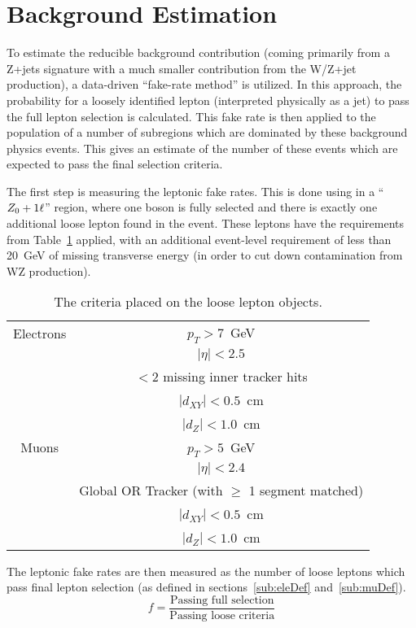 \section{Background Estimation}
\label{sec:bgEst}
To estimate the reducible background contribution (coming primarily from a
Z+jets signature with a much smaller contribution from the W/Z+jet production),
a data-driven ``fake-rate method'' is utilized. In this approach, the
probability for a loosely identified lepton (interpreted physically as a jet) to
pass the full lepton selection is calculated. This fake rate is then applied to
the population of a number of subregions which are dominated by these background
physics events. This gives an estimate of the number of these events which are
expected to pass the final selection criteria.

The first step is measuring the leptonic fake rates. This is done using in a
``${Z}_0 + 1 \ell$'' region, where one \Z boson is fully selected and there is exactly
one additional loose lepton found in the event. These leptons have the
requirements from Table~\ref{tab:looseLeps} applied, with an additional
event-level requirement of less than 20~GeV of missing transverse energy (in
order to cut down contamination from WZ production).

\begin{table}[h]
\centering
\begin{tabular}{|c|c|}
\hline
Electrons & $p_{T}>7$~GeV\\
& $|\eta|<2.5$\\
& $<2$ missing inner tracker hits\\
& $|d_{XY}| < 0.5 $~cm  \\
& $|d_{Z}| < 1.0 $~cm \\
\hline
\hline
Muons & $p_{T}>5$~GeV\\
& $|\eta|<2.4$\\
& Global OR Tracker (with $\ge$ 1 segment matched)\\
& $|d_{XY}| < 0.5$~cm  \\
& $|d_{Z}| < 1.0$~cm  \\
\hline
\end{tabular}
\caption[Loose lepton definitions.]{The criteria placed on the loose lepton objects.}
\label{tab:looseLeps}
\end{table}
The leptonic fake rates are then measured as the number of loose leptons which
pass final lepton selection (as defined in sections~\ref{sub:eleDef}
and~\ref{sub:muDef}).
\begin{equation}
    \label{eqn:fr}
    f = \frac{\textrm{Passing full selection}}{\textrm{Passing loose
    criteria}}
\end{equation}

